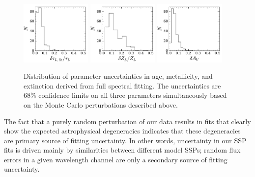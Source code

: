 
 
\begin{figure}
  \centering
  \includegraphics[width=0.31\textwidth]{891_2/figs/fit_uncertainty_MLWA.pdf}
  \includegraphics[width=0.31\textwidth]{891_2/figs/fit_uncertainty_MLWZ.pdf}
  \includegraphics[width=0.31\textwidth]{891_2/figs/fit_uncertainty_TAUV.pdf}
  \caption[Distributions of fit uncertainties in $\tau_L$, $Z_L$,
    $A_V$]{\fixspacing\label{891_2:fig:fit_err_hist}Distribution of
    parameter uncertainties in age, metallicity, and extinction
    derived from full spectral fitting.  The uncertainties are 68\%
    confidence limits on all three parameters simultaneously based on
    the Monte Carlo perturbations described above.}
\end{figure}

The fact that a purely random perturbation of our data results in fits
that clearly show the expected astrophysical degeneracies indicates
that these degeneracies are primary source of fitting uncertainty. In
other words, uncertainty in our SSP fits is driven mainly by
similarities between different model SSPs; random flux errors in a
given wavelength channel are only a secondary source of fitting
uncertainty.

